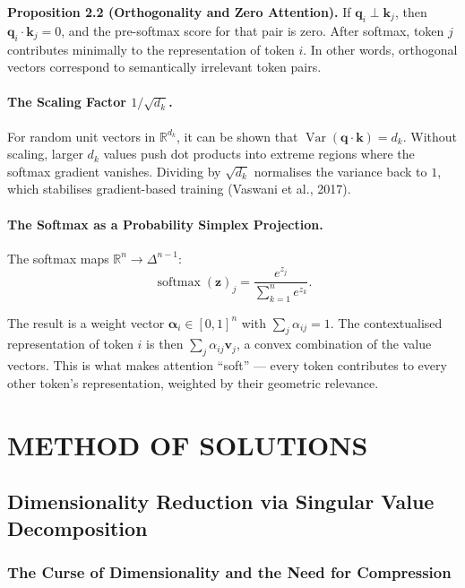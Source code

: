 \documentclass[12pt,a4paper]{article}
\begin{document}
\textbf{Proposition 2.2 (Orthogonality and Zero Attention).} If
$\mathbf{q}_i \perp \mathbf{k}_j$, then $\mathbf{q}_i \cdot \mathbf{k}_j = 0$, and the
pre-softmax score for that pair is zero. After softmax, token $j$ contributes minimally to
the representation of token $i$. In other words, orthogonal vectors correspond to semantically
irrelevant token pairs.

\paragraph{The Scaling Factor $1/\sqrt{d_k}$.}
For random unit vectors in $\mathbb{R}^{d_k}$, it can be shown that
$\operatorname{Var}(\mathbf{q} \cdot \mathbf{k}) = d_k$. Without scaling, larger $d_k$ values
push dot products into extreme regions where the softmax gradient vanishes. Dividing by
$\sqrt{d_k}$ normalises the variance back to $1$, which stabilises gradient-based training
(Vaswani et al., 2017).

\paragraph{The Softmax as a Probability Simplex Projection.}
The softmax maps $\mathbb{R}^n \to \Delta^{n-1}$:
\begin{equation}
    \operatorname{softmax}(\mathbf{z})_j
    = \frac{e^{z_j}}{\displaystyle\sum_{k=1}^{n} e^{z_k}}.
\end{equation}

The result is a weight vector $\boldsymbol{\alpha}_i \in [0,1]^n$ with $\sum_j \alpha_{ij} = 1$.
The contextualised representation of token $i$ is then $\sum_j \alpha_{ij}\mathbf{v}_j$, a
convex combination of the value vectors. This is what makes attention ``soft'' --- every token
contributes to every other token's representation, weighted by their geometric relevance.

\section{METHOD OF SOLUTIONS}

\subsection{Dimensionality Reduction via Singular Value Decomposition}

\subsubsection{The Curse of Dimensionality and the Need for Compression}
\end{document}
